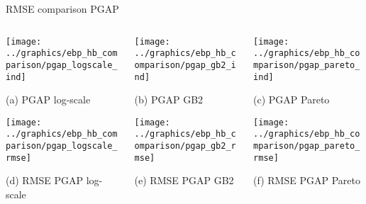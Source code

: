 \begin{frame}{RMSE comparison PGAP}
    \begin{columns}
        \begin{column}{0.32\textwidth}
            \centering

            \texttt{[image: ../graphics/ebp\_hb\_comparison/pgap\_logscale\_ind]}

            \scriptsize{(a) PGAP log-scale}

            \texttt{[image: ../graphics/ebp\_hb\_comparison/pgap\_logscale\_rmse]}

            \scriptsize{(d) RMSE PGAP log-scale}

        \end{column}



        \begin{column}{0.32\textwidth}
            \texttt{[image: ../graphics/ebp\_hb\_comparison/pgap\_gb2\_ind]}

            \scriptsize{(b) PGAP GB2}

            \texttt{[image: ../graphics/ebp\_hb\_comparison/pgap\_gb2\_rmse]}

            \scriptsize{(e) RMSE PGAP GB2}
        \end{column}

        \begin{column}{0.32\textwidth}
            \texttt{[image: ../graphics/ebp\_hb\_comparison/pgap\_pareto\_ind]}

            \scriptsize{(c) PGAP Pareto}

            \texttt{[image: ../graphics/ebp\_hb\_comparison/pgap\_pareto\_rmse]}

            \scriptsize{(f) RMSE PGAP Pareto}
        \end{column}
    \end{columns}
\end{frame}